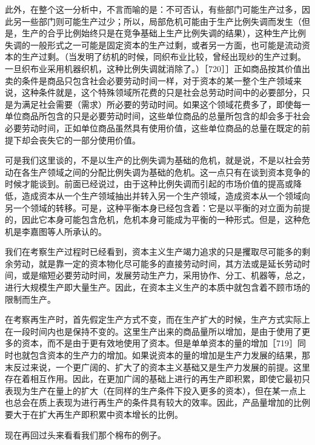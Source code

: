 此外，在整个这一分析中，不言而喻的是：不可否认，有些部门可能生产过多，因此另一些部门则可能生产过少；所以，局部危机可能由于生产比例失调而发生（但是，生产的合乎比例始终只是在竞争基础上生产比例失调的结果），这种生产比例失调的一般形式之一可能是固定资本的生产过剩，或者另一方面，也可能是流动资本的生产过剩。（当发明了纺机的时候，同织布业比较，曾经出现纱的生产过剩。一旦织布业采用机器织机，这种比例失调就消除了。）［720］］正如商品按其价值出卖的条件是商品只包含社会必要劳动时间一样，对于资本的某一整个生产领域来说，这种条件就是，这个特殊领域所花费的只是社会总劳动时间中的必要部分，只是为满足社会需要（需求）所必要的劳动时间。如果这个领域花费多了，即使每一单位商品所包含的只是必要劳动时间，这些单位商品的总量所包含的却会多于社会必要劳动时间，正如单位商品虽然具有使用价值，这些单位商品的总量在既定的前提下却会丧失它的一部分使用价值。

可是我们这里谈的，不是以生产的比例失调为基础的危机，就是说，不是以社会劳动在各生产领域之间的分配比例失调为基础的危机。这一点只有在谈到资本竞争的时候才能谈到。前面已经说过，由于这种比例失调而引起的市场价值的提高或降低，造成资本从一个生产领域抽出并转入另一个生产领域，造成资本从一个领域向另一个领域的转移。可是，这种平衡本身已经包含着：它是以平衡的对立面为前提的，因此它本身可能包含危机，危机本身可能成为平衡的一种形式。但是，这种危机是李嘉图等人所承认的。

我们在考察生产过程时已经看到，资本主义生产竭力追求的只是攫取尽可能多的剩余劳动，就是靠一定的资本物化尽可能多的直接劳动时间，其方法或是延长劳动时间，或是缩短必要劳动时间，发展劳动生产力，采用协作、分工、机器等，总之，进行大规模生产即大量生产。因此，在资本主义生产的本质中就包含着不顾市场的限制而生产。

在考察再生产时，首先假定生产方式不变，而在生产扩大的时候，生产方式实际上在一段时间内也是保持不变的。这里生产出来的商品量所以增加，是由于使用了更多的资本，而不是由于更有效地使用了资本。但是单单资本的量的增加［719］同时也就包含资本的生产力的增加。如果说资本的量的增加是生产力发展的结果，那末反过来说，一个更广阔的、扩大了的资本主义基础又是生产力发展的前提。这里存在着相互作用。因此，在更加广阔的基础上进行的再生产即积累，即使它最初只表现为生产在量上的扩大（在同样的生产条件下投入更多的资本），但在某一点上也总会在质上表现为进行再生产的条件具有较大的效率。因此，产品量增加的比例要大于在扩大再生产即积累中资本增长的比例。

现在再回过头来看看我们那个棉布的例子。

